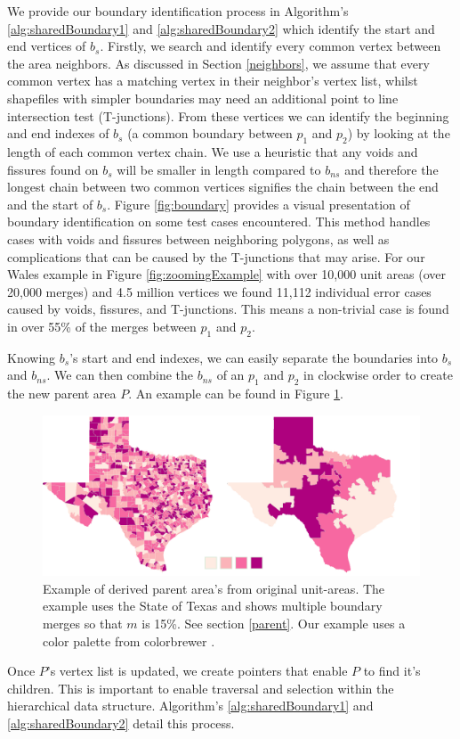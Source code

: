  We provide our boundary identification process in Algorithm's \ref{alg:sharedBoundary1} and \ref{alg:sharedBoundary2} which identify the start and end vertices of $b_{s}$. 
Firstly, we search and identify every common vertex between the area neighbors. As discussed in Section \ref{neighbors}, we assume that every common vertex has a matching vertex in their neighbor's vertex list, whilst shapefiles with simpler boundaries may need an additional point to line intersection test (T-junctions). From these vertices we can identify the beginning and end indexes of $b_{s}$ (a common boundary between $p_1$ and $p_2$) by looking at the length of each common vertex chain. We use a heuristic that any voids and fissures found on $b_{s}$ will be smaller in length compared to $b_{ns}$ and therefore the longest chain between two common vertices signifies the chain between the end and the start of $b_{s}$. Figure \ref{fig:boundary} provides a visual presentation of boundary identification on some test cases encountered. This method handles cases with voids and fissures between neighboring polygons, as well as complications that can be caused by the T-junctions that may arise. For our Wales example in Figure \ref{fig:zoomingExample} with over 10,000 unit areas (over 20,000 merges) and 4.5 million vertices we found 11,112 individual error cases caused by voids, fissures, and T-junctions. This means a non-trivial case is found in over 55\% of the merges between $p_1$ and $p_2$.

Knowing $b_{s}$'s start and end indexes, we can easily separate the boundaries into $b_{s}$ and $b_{ns}$. We can then combine the $b_{ns}$ of an $p_1$ and $p_2$ in clockwise order to create the new parent area $P$. An example can be found in Figure \ref{fig:parent}.

\begin{figure}[t]
\centering
\includegraphics[width=0.7\linewidth]{images/TexasExample}
\caption{Example of derived parent area's from original unit-areas. The example uses the State of Texas and shows multiple boundary merges \cite{Texas} so that $m$ is 15\%.  See section \ref{parent}. Our example uses a color palette from colorbrewer \cite{colorbrewer}. } \label{fig:parent} 
\end{figure} 
 Once $P$'s vertex list is updated, we create pointers that enable $P$ to find it's children. This is important to enable traversal and selection within the hierarchical data structure. Algorithm's \ref{alg:sharedBoundary1} and \ref{alg:sharedBoundary2} detail this process.

